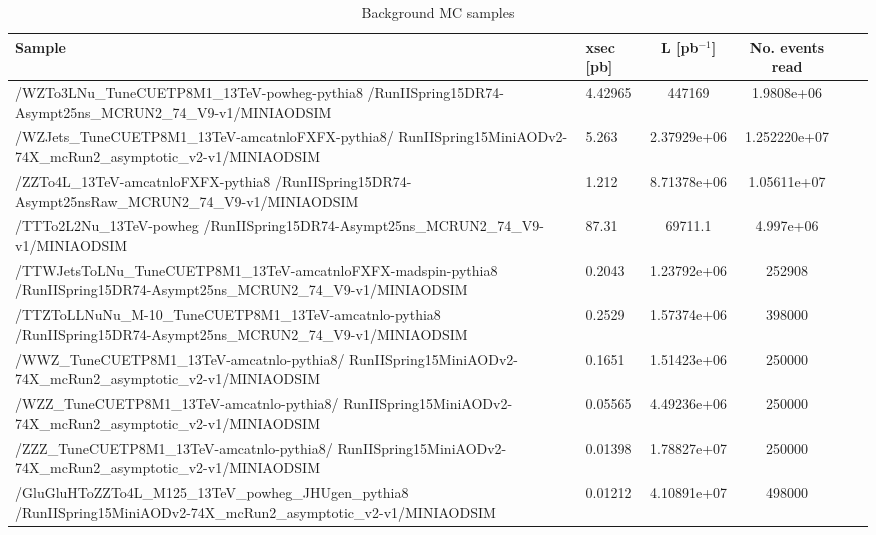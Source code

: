 \begin{table}
\centering
\caption{Background MC samples} \label{tab:MCSamples}
\begin{tabular}{p{14cm} l c c c l}
\hline\hline
Sample & xsec [pb] & L [pb$^{-1}$] & No. events read\\
\hline
/WZTo3LNu\_TuneCUETP8M1\_13TeV-powheg-pythia8 \newline /RunIISpring15DR74-Asympt25ns\_MCRUN2\_74\_V9-v1/MINIAODSIM	& 4.42965	& 447169	& 1.9808e+06\\
\hline
/WZJets\_TuneCUETP8M1\_13TeV-amcatnloFXFX-pythia8/ \newline RunIISpring15MiniAODv2-74X\_mcRun2\_asymptotic\_v2-v1/MINIAODSIM	& 5.263	& 2.37929e+06	& 1.252220e+07\\
\hline
/ZZTo4L\_13TeV-amcatnloFXFX-pythia8 \newline /RunIISpring15DR74-Asympt25nsRaw\_MCRUN2\_74\_V9-v1/MINIAODSIM	& 1.212	& 8.71378e+06	& 1.05611e+07\\
\hline
/TTTo2L2Nu\_13TeV-powheg \newline /RunIISpring15DR74-Asympt25ns\_MCRUN2\_74\_V9-v1/MINIAODSIM	& 87.31	& 69711.1	& 4.997e+06\\ 
\hline
/TTWJetsToLNu\_TuneCUETP8M1\_13TeV-amcatnloFXFX-madspin-pythia8 \newline /RunIISpring15DR74-Asympt25ns\_MCRUN2\_74\_V9-v1/MINIAODSIM	& 0.2043	& 1.23792e+06	& 252908\\
\hline
/TTZToLLNuNu\_M-10\_TuneCUETP8M1\_13TeV-amcatnlo-pythia8 \newline /RunIISpring15DR74-Asympt25ns\_MCRUN2\_74\_V9-v1/MINIAODSIM	& 0.2529	& 1.57374e+06	& 398000\\
\hline
/WWZ\_TuneCUETP8M1\_13TeV-amcatnlo-pythia8/ \newline RunIISpring15MiniAODv2-74X\_mcRun2\_asymptotic\_v2-v1/MINIAODSIM	& 0.1651	& 1.51423e+06	& 250000\\
\hline
/WZZ\_TuneCUETP8M1\_13TeV-amcatnlo-pythia8/ \newline RunIISpring15MiniAODv2-74X\_mcRun2\_asymptotic\_v2-v1/MINIAODSIM	& 0.05565	& 4.49236e+06	& 250000\\
\hline
/ZZZ\_TuneCUETP8M1\_13TeV-amcatnlo-pythia8/ \newline RunIISpring15MiniAODv2-74X\_mcRun2\_asymptotic\_v2-v1/MINIAODSIM	& 0.01398	& 1.78827e+07	& 250000\\
\hline
/GluGluHToZZTo4L\_M125\_13TeV\_powheg\_JHUgen\_pythia8 \newline /RunIISpring15MiniAODv2-74X\_mcRun2\_asymptotic\_v2-v1/MINIAODSIM	& 0.01212	& 4.10891e+07	& 498000\\

\end{tabular}
\end{table}
